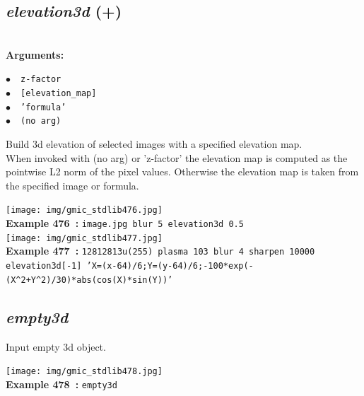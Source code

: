 \documentclass[a4paper,10.5pt,twoside]{book}
\def\comma{\discretionary{,}{}{,}}
\newcommand{\Cb}[1]{\textcolor{cb}{#1}}
\begin{document}
\subsection{\emph{elevation3d} (+)}\vspace*{-0.7em}
~\\\textbf{\Cb{Arguments: }}\begin{flushleft}
{\small \Cb{\hspace*{0.5cm}$\bullet$~~\texttt{z-factor}}}~~~\\
{\small \Cb{\hspace*{0.5cm}$\bullet$~~\texttt{[elevation\_map]}}}~~~\\
{\small \Cb{\hspace*{0.5cm}$\bullet$~~\texttt{'formula'}}}~~~\\
{\small \Cb{\hspace*{0.5cm}$\bullet$~~\texttt{(no arg)}}}\end{flushleft}
Build 3d elevation of selected images{\comma} with a specified elevation map.
~\\When invoked with (no arg) or 'z-factor'{\comma} the elevation map is computed as the pointwise L2 norm of the
pixel values. Otherwise{\comma} the elevation map is taken from the specified image or formula.
\begin{center}\texttt{[image: img/gmic\_stdlib476.jpg]}\\
{\footnotesize \textbf{Example 476~:} \texttt{image.jpg blur 5 elevation3d 0.5}}
\\\texttt{[image: img/gmic\_stdlib477.jpg]}\\
{\footnotesize \textbf{Example 477~:} \texttt{128{\comma}128{\comma}1{\comma}3{\comma}u(255) plasma 10{\comma}3 blur 4 sharpen 10000 elevation3d[-1] 'X=(x-64)/6;Y=(y-64)/6;-100*exp(-(X\textasciicircum 2+Y\textasciicircum 2)/30)*abs(cos(X)*sin(Y))'}}
\end{center}

\subsection{\emph{empty3d} }\vspace*{-0.7em}
Input empty 3d object.
\begin{center}\texttt{[image: img/gmic\_stdlib478.jpg]}\\
{\footnotesize \textbf{Example 478~:} \texttt{empty3d}}
\end{center}
\end{document}
